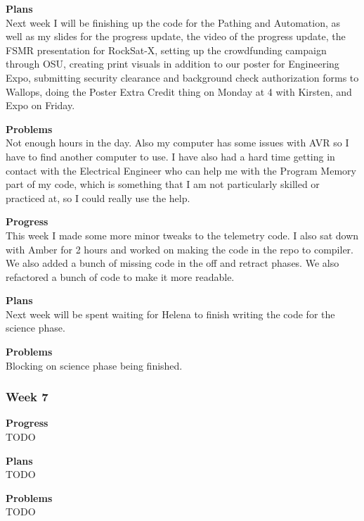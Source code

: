 \textbf{Plans} \\ 
Next week I will be finishing up the code for the Pathing and Automation, as well as my slides for the progress update, the video of the progress update, the FSMR presentation for RockSat-X, setting up the crowdfunding campaign through OSU, creating print visuals in addition to our poster for Engineering Expo, submitting security clearance and background check authorization forms to Wallops, doing the Poster Extra Credit thing on Monday at 4 with Kirsten, and Expo on Friday.

\textbf{Problems} \\ 
Not enough hours in the day. Also my computer has some issues with AVR so I have to find another computer to use. I have also had a hard time getting in contact with the Electrical Engineer who can help me with the Program Memory part of my code, which is something that I am not particularly skilled or practiced at, so I could really use the help.

\textbf{Progress} \\
This week I made some more minor tweaks to the telemetry code. I also sat down with Amber for 2 hours and worked on making the code in the repo to compiler. We also added a bunch of missing code in the off and retract phases. We also refactored a bunch of code to make it more readable.

\textbf{Plans} \\
Next week will be spent waiting for Helena to finish writing the code for the science phase.

\textbf{Problems} \\
Blocking on science phase being finished.

\subsubsection{Week 7}
\textbf{Progress} \\ 
TODO

\textbf{Plans} \\ 
TODO

\textbf{Problems} \\ 
TODO

